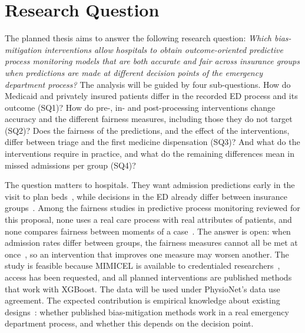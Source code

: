 \section{Research Question}\label{section::research_question}

The planned thesis aims to answer the following research question: \emph{Which bias-mitigation interventions allow hospitals to obtain outcome-oriented predictive process monitoring models that are both accurate and fair across insurance groups when predictions are made at different decision points of the emergency department process?} The analysis will be guided by four sub-questions. How do Medicaid and privately insured patients differ in the recorded ED process and its outcome (SQ1)? How do pre-, in- and post-processing interventions change accuracy and the different fairness measures, including those they do not target (SQ2)? Does the fairness of the predictions, and the effect of the interventions, differ between triage and the first medicine dispensation (SQ3)? And what do the interventions require in practice, and what do the remaining differences mean in missed admissions per group (SQ4)?

The question matters to hospitals. They want admission predictions early in the visit to plan beds~\cite{king2022machine}, while decisions in the ED already differ between insurance groups~\cite{venkatesh2019association,prucnal2025patterns}. Among the fairness studies in predictive process monitoring reviewed for this proposal, none uses a real care process with real attributes of patients, and none compares fairness between moments of a case~\cite{deleoni2025achieving,peeperkorn2025achieving,dasilva2025towards,kappel2026human,mohrlein2025fairloop,desantis2027fairness}. The answer is open: when admission rates differ between groups, the fairness measures cannot all be met at once~\cite{paulus2020predictably}, so an intervention that improves one measure may worsen another. The study is feasible because MIMICEL is available to credentialed researchers~\cite{wei2023mimicel}, access has been requested, and all planned interventions are published methods that work with XGBoost. The data will be used under PhysioNet's data use agreement. The expected contribution is empirical knowledge about existing designs~\cite{10.1145/3769071}: whether published bias-mitigation methods work in a real emergency department process, and whether this depends on the decision point.

